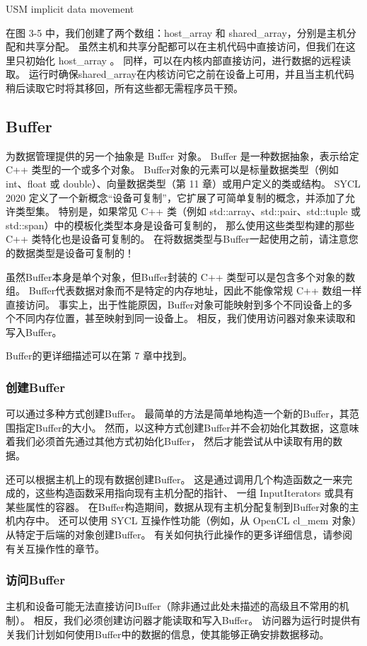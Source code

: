 {\color{red} USM implicit data movement }

在图 3-5 中，我们创建了两个数组：host\_array 和 shared\_array，分别是主机分配和共享分配。 
虽然主机和共享分配都可以在主机代码中直接访问，但我们在这里只初始化 host\_array 。 
同样，可以在内核内部直接访问，进行数据的远程读取。 
运行时确保shared\_array在内核访问它之前在设备上可用，并且当主机代码稍后读取它时将其移回，所有这些都无需程序员干预。

\subsection{Buffer}
为数据管理提供的另一个抽象是 Buffer 对象。 Buffer 是一种数据抽象，表示给定 C++ 类型的一个或多个对象。 
Buffer对象的元素可以是标量数据类型（例如 int、float 或 double）、向量数据类型（第 11 章）或用户定义的类或结构。 
SYCL 2020 定义了一个新概念“设备可复制”，它扩展了可简单复制的概念，并添加了允许类型集。 
特别是，如果常见 C++ 类（例如 std::array、std::pair、std::tuple 或 std::span）中的模板化类型本身是设备可复制的，
那么使用这些类型构建的那些 C++ 类特化也是设备可复制的。 
在将数据类型与Buffer一起使用之前，请注意您的数据类型是设备可复制的！

虽然Buffer本身是单个对象，但Buffer封装的 C++ 类型可以是包含多个对象的数组。 
Buffer代表数据对象而不是特定的内存地址，因此不能像常规 C++ 数组一样直接访问。 
事实上，出于性能原因，Buffer对象可能映射到多个不同设备上的多个不同内存位置，甚至映射到同一设备上。 
相反，我们使用访问器对象来读取和写入Buffer。

Buffer的更详细描述可以在第 7 章中找到。

\subsubsection{创建Buffer}
可以通过多种方式创建Buffer。 最简单的方法是简单地构造一个新的Buffer，其范围指定Buffer的大小。 
然而，以这种方式创建Buffer并不会初始化其数据，这意味着我们必须首先通过其他方式初始化Buffer，
然后才能尝试从中读取有用的数据。

还可以根据主机上的现有数据创建Buffer。 
这是通过调用几个构造函数之一来完成的，这些构造函数采用指向现有主机分配的指针、
一组 InputIterators 或具有某些属性的容器。 在Buffer构造期间，数据从现有主机分配复制到Buffer对象的主机内存中。 
还可以使用 SYCL 互操作性功能（例如，从 OpenCL cl\_mem 对象）从特定于后端的对象创建Buffer。 
有关如何执行此操作的更多详细信息，请参阅有关互操作性的章节。

\subsubsection{访问Buffer}
主机和设备可能无法直接访问Buffer（除非通过此处未描述的高级且不常用的机制）。 
相反，我们必须创建访问器才能读取和写入Buffer。 
访问器为运行时提供有关我们计划如何使用Buffer中的数据的信息，使其能够正确安排数据移动。

